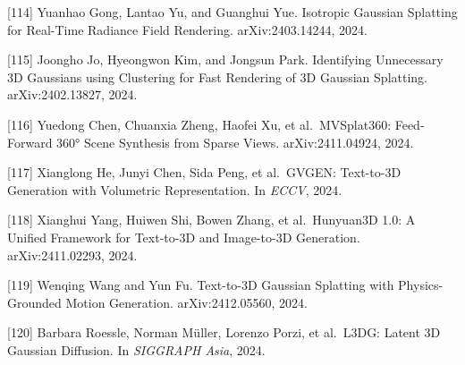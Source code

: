 {[}114{]} Yuanhao Gong, Lantao Yu, and Guanghui Yue. Isotropic Gaussian Splatting for Real-Time Radiance Field Rendering. arXiv:2403.14244, 2024.

{[}115{]} Joongho Jo, Hyeongwon Kim, and Jongsun Park. Identifying Unnecessary 3D Gaussians using Clustering for Fast Rendering of 3D Gaussian Splatting. arXiv:2402.13827, 2024.

{[}116{]} Yuedong Chen, Chuanxia Zheng, Haofei Xu, et al.~MVSplat360: Feed-Forward 360° Scene Synthesis from Sparse Views. arXiv:2411.04924, 2024.

{[}117{]} Xianglong He, Junyi Chen, Sida Peng, et al.~GVGEN: Text-to-3D Generation with Volumetric Representation. In \emph{ECCV}, 2024.

{[}118{]} Xianghui Yang, Huiwen Shi, Bowen Zhang, et al.~Hunyuan3D 1.0: A Unified Framework for Text-to-3D and Image-to-3D Generation. arXiv:2411.02293, 2024.

{[}119{]} Wenqing Wang and Yun Fu. Text-to-3D Gaussian Splatting with Physics-Grounded Motion Generation. arXiv:2412.05560, 2024.

{[}120{]} Barbara Roessle, Norman Müller, Lorenzo Porzi, et al.~L3DG: Latent 3D Gaussian Diffusion. In \emph{SIGGRAPH Asia}, 2024.
